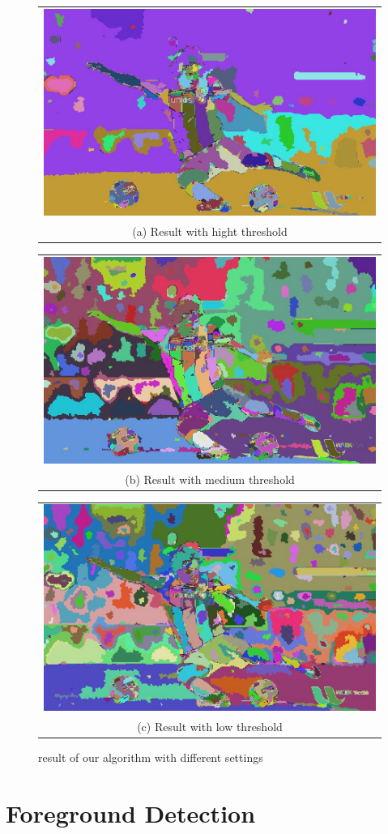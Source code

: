\documentclass[conference]{IEEEtran}
\begin{document}
\begin{figure}[h!]
  \centering
  \begin{tabular}{@{}c@{}}
    \includegraphics[width=0.4\linewidth]{fig7.jpg} \\[\abovecaptionskip]
    \small (a) Result with hight threshold
  \end{tabular}
  \begin{tabular}{@{}c@{}}
    \includegraphics[width=0.4\linewidth]{fig8.jpg} \\[\abovecaptionskip]
    \small (b) Result with medium  threshold
  \end{tabular}

  \vspace{\floatsep}

  \begin{tabular}{@{}c@{}}
    \includegraphics[width=0.7\linewidth]{fig9.jpg} \\[\abovecaptionskip]
    \small (c) Result with low threshold
  \end{tabular}
  \caption{result of our algorithm with different settings}
  \label{fig 2}
  
\end{figure}


\section{Foreground Detection}
\end{document}
